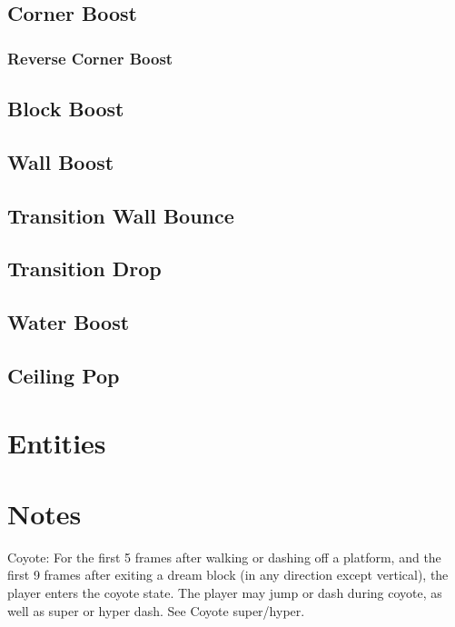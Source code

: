 \documentclass[oneside]{book}
\begin{document}
\section{Corner Boost}

\subsection{Reverse Corner Boost}

\section{Block Boost}

\section{Wall Boost}

\section{Transition Wall Bounce}

\section{Transition Drop}

\section{Water Boost}

\section{Ceiling Pop}

\chapter{Entities}

\chapter{Notes}



Coyote:
For the first 5 frames after walking or dashing off a platform, and the first 9 frames after exiting a dream block (in any direction except vertical), the player enters the coyote state. The player may jump or dash during coyote, as well as super or hyper dash. See Coyote super/hyper.
\end{document}
